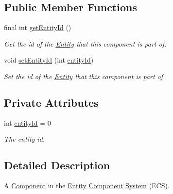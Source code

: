 \subsection*{Public Member Functions}
\begin{DoxyCompactItemize}
\item 
final int \hyperlink{classbr_1_1unb_1_1unbomber_1_1core_1_1_component_a2b3ada6a7339f684a3f0d878d8b1fdc2}{get\+Entity\+Id} ()
\begin{DoxyCompactList}\small\item\em Get the id of the \hyperlink{classbr_1_1unb_1_1unbomber_1_1core_1_1_entity}{Entity} that this component is part of. \end{DoxyCompactList}\item 
void \hyperlink{classbr_1_1unb_1_1unbomber_1_1core_1_1_component_a91645368d2588fa1d857346ac254d40b}{set\+Entity\+Id} (int \hyperlink{classbr_1_1unb_1_1unbomber_1_1core_1_1_component_a3eff11219571ba1890651e922b9879ef}{entity\+Id})
\begin{DoxyCompactList}\small\item\em Set the id of the \hyperlink{classbr_1_1unb_1_1unbomber_1_1core_1_1_entity}{Entity} that this component is part of. \end{DoxyCompactList}\end{DoxyCompactItemize}
\subsection*{Private Attributes}
\begin{DoxyCompactItemize}
\item 
int \hyperlink{classbr_1_1unb_1_1unbomber_1_1core_1_1_component_a3eff11219571ba1890651e922b9879ef}{entity\+Id} = 0
\begin{DoxyCompactList}\small\item\em The entity id. \end{DoxyCompactList}\end{DoxyCompactItemize}


\subsection{Detailed Description}
A \hyperlink{classbr_1_1unb_1_1unbomber_1_1core_1_1_component}{Component} in the \hyperlink{classbr_1_1unb_1_1unbomber_1_1core_1_1_entity}{Entity} \hyperlink{classbr_1_1unb_1_1unbomber_1_1core_1_1_component}{Component} \hyperlink{interfacebr_1_1unb_1_1unbomber_1_1core_1_1_system}{System} (E\+C\+S). 


